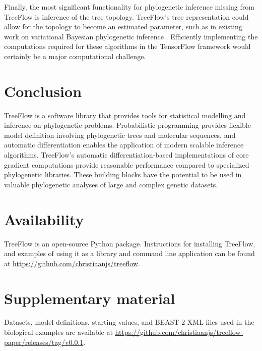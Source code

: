 Finally, the most significant functionality for phylogenetic inference missing from TreeFlow is inference of the tree topology. TreeFlow's tree representation could allow for the topology to become an estimated parameter, such as in existing work on variational Bayesian phylogenetic inference \cite{zhang2018variational}. Efficiently implementing the computations required for these algorithms in the TensorFlow framework would certainly be a major computational challenge.

\section{Conclusion}

TreeFlow is a software library that provides tools for statistical modelling and inference on phylogenetic problems. Probabilistic programming provides flexible model definition involving phylogenetic trees and molecular sequences, and automatic differentiation enables the application of modern scalable inference algorithms. TreeFlow's automatic differentiation-based implementations of core gradient computations provide reasonable performance compared to specialized phylogenetic libraries. These building blocks have the potential to be used in valuable phylogenetic analyses of large and complex genetic datasets.

\section{Availability}

TreeFlow is an open-source Python package. Instructions for installing TreeFlow, and examples of using it as a library and command line application can be found at \url{https://github.com/christiaanjs/treeflow}.

\section{Supplementary material}

Datasets, model definitions, starting values, and BEAST 2 XML files used in the biological examples are available at \url{https://github.com/christiaanjs/treeflow-paper/releases/tag/v0.0.1}.

